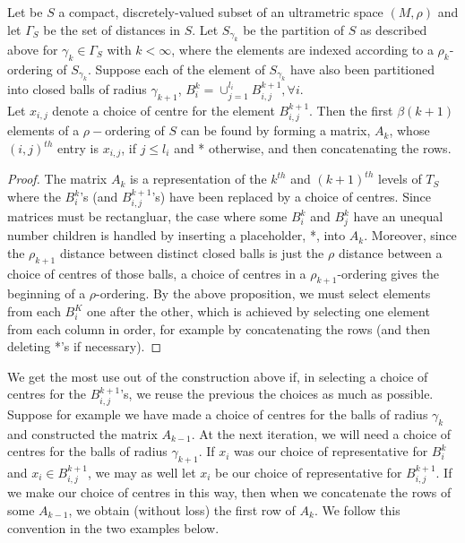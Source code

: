 \begin{proposition}
Let be $S$ a compact, discretely-valued subset of an ultrametric space $(M, \rho)$ and let $\Gamma_S$ be the set of distances in $S$. Let $S_{\gamma_k}$ be the partition of $S$ as described above for $\gamma_k \in \Gamma_S$ with $k < \infty$, where the elements are indexed according to a $\rho_k$-ordering of $S_{\gamma_k}$. Suppose each of the element of $S_{\gamma_k}$ have also been partitioned into closed balls of radius $\gamma_{k+1}$, $B^k_i =\cup_{j=1}^{l_i} B^{k+1}_{i,j}, \forall i$.\\

Let $x_{i,j}$ denote a choice of centre for the element $B^{k+1}_{i,j}$. Then the first $\beta(k+1)$ elements of a $\rho-$ordering of $S$ can be found by forming a matrix, $A_k$, whose $(i,j)^{th}$ entry is $x_{i,j}$, if $j \leq l_i$ and * otherwise, and then concatenating the rows.
\end{proposition}


\begin{proof}
The matrix $A_k$ is a representation of the $k^{th}$ and $(k+1)^{th}$ levels of $T_S$ where the $B^k_i$'s (and $B^{k+1}_{i,j}$'s) have been replaced by a choice of centres. Since matrices must be rectangluar, the case where some $B^k_i$ and $B^k_j$ have an unequal number children is handled by inserting a placeholder, *, into $A_k$.  Moreover, since the $\rho_{k+1}$ distance between distinct closed balls is just the $\rho$ distance between a choice of centres of those  balls, a choice of centres in a $\rho_{k+1}$-ordering gives the beginning of a $\rho$-ordering.  By the above proposition, we must select elements from each $B^K_i$ one after the other, which is achieved by selecting one element from each column in order, for example by concatenating the rows (and then deleting *'s if necessary). 
\end{proof}

We get the most use out of the construction above if, in selecting a choice of centres for the $B^{k+1}_{i,j}$'s, we reuse the previous the choices as much as possible. Suppose for example we have made a choice of centres for the balls of radius $\gamma_k$ and constructed the matrix $A_{k-1}$. At the next iteration, we will need a choice of centres for the balls of radius $\gamma_{k+1}$. If $x_i$ was our choice of representative for $B^k_i$ and $x_i \in B^{k+1}_{i,j}$, we may as well let $x_i$ be our choice of representative for $B^{k+1}_{i,j}$. If we make our choice of centres in this way, then when we concatenate the rows of some $A_{k-1}$, we obtain (without loss) the first row of $A_k$. We follow this convention in the two examples below.\\

